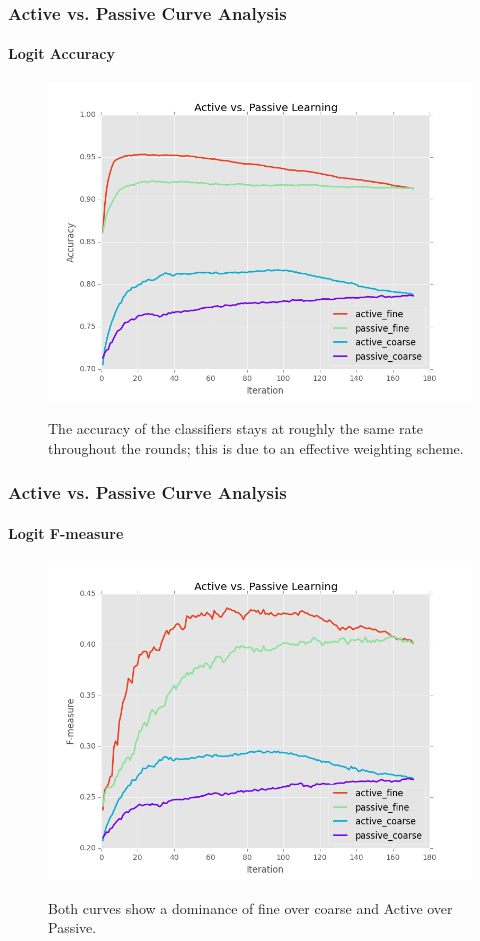 \documentclass{beamer}
\begin{document}
\begin{frame}
    \frametitle{Active vs. Passive Curve Analysis}
    \framesubtitle{Logit Accuracy}
    \begin{figure}[!htb]
        \centering
        \includegraphics[width=0.70\columnwidth]{fig/runActPassLogReg_acc}
        \label{fig:runActPassLogReg_acc}
        \caption{The accuracy of the classifiers stays at
roughly the same rate throughout the rounds; this is due to an effective
weighting scheme.}
    \end{figure}
\end{frame}
\begin{frame}
    \frametitle{Active vs. Passive Curve Analysis}
    \framesubtitle{Logit F-measure}
    \begin{figure}[!htb]
        \centering
        \includegraphics[width=0.70\columnwidth]{fig/runActPassLogReg_f1}
        \label{fig:runActPassLogReg_f1}
        \caption{Both curves show a dominance of fine over coarse and
Active over Passive.}
    \end{figure}
\end{frame}
\end{document}
